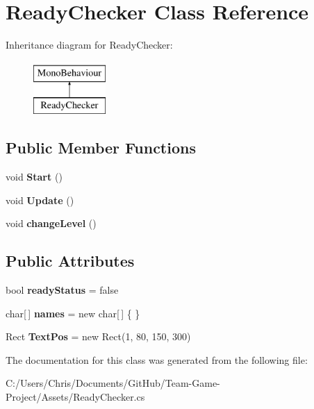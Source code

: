 \hypertarget{class_ready_checker}{}\section{Ready\+Checker Class Reference}
\label{class_ready_checker}
Inheritance diagram for Ready\+Checker\+:\begin{figure}[H]
\begin{center}
\leavevmode
\includegraphics[height=2.000000cm]{class_ready_checker}
\end{center}
\end{figure}
\subsection*{Public Member Functions}
\begin{DoxyCompactItemize}
\item 
void {\bfseries Start} ()\hypertarget{class_ready_checker_a27ca28b39dcb8c1ce877897697ce2b18}{}\label{class_ready_checker_a27ca28b39dcb8c1ce877897697ce2b18}

\item 
void {\bfseries Update} ()\hypertarget{class_ready_checker_a11648768e68fb12475d54e720bbddab6}{}\label{class_ready_checker_a11648768e68fb12475d54e720bbddab6}

\item 
void {\bfseries change\+Level} ()\hypertarget{class_ready_checker_abffed304ead7c2ce9762fe6e94904023}{}\label{class_ready_checker_abffed304ead7c2ce9762fe6e94904023}

\end{DoxyCompactItemize}
\subsection*{Public Attributes}
\begin{DoxyCompactItemize}
\item 
bool {\bfseries ready\+Status} = false\hypertarget{class_ready_checker_ad0014e4d0e9f56c96f7d4f2bb23f69e3}{}\label{class_ready_checker_ad0014e4d0e9f56c96f7d4f2bb23f69e3}

\item 
char\mbox{[}$\,$\mbox{]} {\bfseries names} = new char\mbox{[}$\,$\mbox{]} \{ \}\hypertarget{class_ready_checker_a97690441cc708d76022e3537eaa6184b}{}\label{class_ready_checker_a97690441cc708d76022e3537eaa6184b}

\item 
Rect {\bfseries Text\+Pos} = new Rect(1, 80, 150, 300)\hypertarget{class_ready_checker_afa679dd481f0d8a6783af3cc1eebfcc7}{}\label{class_ready_checker_afa679dd481f0d8a6783af3cc1eebfcc7}

\end{DoxyCompactItemize}


The documentation for this class was generated from the following file\+:\begin{DoxyCompactItemize}
\item 
C\+:/\+Users/\+Chris/\+Documents/\+Git\+Hub/\+Team-\/\+Game-\/\+Project/\+Assets/Ready\+Checker.\+cs\end{DoxyCompactItemize}
